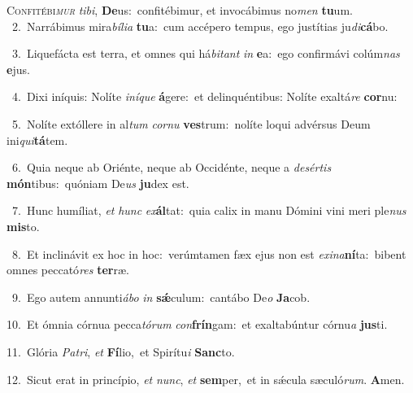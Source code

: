 \lettrine{\initial\textcolor{\initialcolor}{C}}{onfitébi\-\textit{mur}\-} \textit{ti}\-\textit{bi}, \textbf{De}\-us:~\star confitébimur, et invocábimus no\textit{men} \textbf{tu}\-um.\\
{\numbfont\textcolor{\numbcolor}{~2.}}~Narrábimus mira\-\textit{bí}\-\textit{li}\textit{a} \textbf{tu}\-a:~\star cum accépero tempus, ego justítias ju\-\textit{di}\-\textbf{cá}bo.\par
{\numbfont\textcolor{\numbcolor}{~3.}}~Liquefácta est terra, et omnes qui há\-\textit{bi}\-\textit{tant} \textit{in} \textbf{e}\-a:~\star ego confirmávi colúm\textit{nas} \textbf{e}\-jus.\par
{\numbfont\textcolor{\numbcolor}{~4.}}~Dixi iníquis: Nolíte \textit{in}\-\textit{í}\textit{que} \textbf{á}\-gere:~\star et delinquéntibus: Nolíte exaltá\textit{re} \textbf{cor}\-nu:\par
{\numbfont\textcolor{\numbcolor}{~5.}}~Nolíte extóllere in al\textit{tum} \textit{cor}\-\textit{nu} \textbf{ves}\-trum:~\star nolíte loqui advérsus Deum ini\-\textit{qui}\-\textbf{tá}tem.\par
{\numbfont\textcolor{\numbcolor}{~6.}}~Quia neque ab Oriénte, neque ab Occidénte, neque a \textit{de}\-\textit{sér}\textit{tis} \textbf{món}\-tibus:~\star quóniam De\textit{us} \textbf{ju}\-dex est.\par
{\numbfont\textcolor{\numbcolor}{~7.}}~Hunc humíliat, \textit{et} \textit{hunc} \textit{ex}\-\textbf{ál}tat:~\star quia calix in manu Dómini vini meri ple\textit{nus} \textbf{mis}\-to.\par
{\numbfont\textcolor{\numbcolor}{~8.}}~Et inclinávit ex hoc in hoc:~\dagger verúmtamen fæx ejus non est \textit{ex}\-\textit{i}\textit{na}\textbf{ní}ta:~\star bibent omnes peccató\textit{res} \textbf{ter}\-ræ.\par
{\numbfont\textcolor{\numbcolor}{~9.}}~Ego autem annunti\-\textit{á}\-\textit{bo} \textit{in} \textbf{sǽ}\-culum:~\star cantábo De\textit{o} \textbf{Ja}\-cob.\par
{\numbfont\textcolor{\numbcolor}{10.}}~Et ómnia córnua pecca\-\textit{tó}\-\textit{rum} \textit{con}\-\textbf{frín}gam:~\star et exaltabúntur córnu\textit{a} \textbf{jus}\-ti.\par
{\numbfont\textcolor{\numbcolor}{11.}}~Glória \textit{Pa}\-\textit{tri}, \textit{et} \textbf{Fí}\-lio,~\star et Spirítu\textit{i} \textbf{Sanc}\-to.\par
{\numbfont\textcolor{\numbcolor}{12.}}~Sicut erat in princípio, \textit{et} \textit{nunc}\-, \textit{et} \textbf{sem}\-per,~\star et in sǽcula sæculó\-\textit{rum}\-. \textbf{A}\-men.\par
